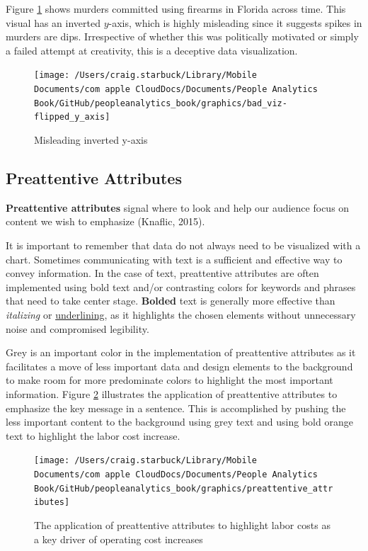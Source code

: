 \documentclass[
]{book}
\begin{document}
Figure \ref{fig:flipped-axis-viz} shows murders committed using firearms in Florida across time. This visual has an inverted \(y\)-axis, which is highly misleading since it suggests spikes in murders are dips. Irrespective of whether this was politically motivated or simply a failed attempt at creativity, this is a deceptive data visualization.

\begin{figure}

{\centering \texttt{[image: /Users/craig.starbuck/Library/Mobile Documents/com~apple~CloudDocs/Documents/People Analytics Book/GitHub/peopleanalytics\_book/graphics/bad\_viz-flipped\_y\_axis]} 

}

\caption{Misleading inverted y-axis}\label{fig:flipped-axis-viz}
\end{figure}

\hypertarget{preattentive-attributes}{%
\subsection{Preattentive Attributes}\label{preattentive-attributes}}

\textbf{Preattentive attributes} signal where to look and help our audience focus on content we wish to emphasize (Knaflic, 2015).

It is important to remember that data do not always need to be visualized with a chart. Sometimes communicating with text is a sufficient and effective way to convey information. In the case of text, preattentive attributes are often implemented using bold text and/or contrasting colors for keywords and phrases that need to take center stage. \textbf{Bolded} text is generally more effective than \emph{italizing} or \underline{underlining}, as it highlights the chosen elements without unnecessary noise and compromised legibility.

Grey is an important color in the implementation of preattentive attributes as it facilitates a move of less important data and design elements to the background to make room for more predominate colors to highlight the most important information. Figure \ref{fig:pre-attr-1} illustrates the application of preattentive attributes to emphasize the key message in a sentence. This is accomplished by pushing the less important content to the background using grey text and using bold orange text to highlight the labor cost increase.

\begin{figure}

{\centering \texttt{[image: /Users/craig.starbuck/Library/Mobile Documents/com~apple~CloudDocs/Documents/People Analytics Book/GitHub/peopleanalytics\_book/graphics/preattentive\_attributes]} 

}

\caption{The application of preattentive attributes to highlight labor costs as a key driver of operating cost increases}\label{fig:pre-attr-1}
\end{figure}
\end{document}
